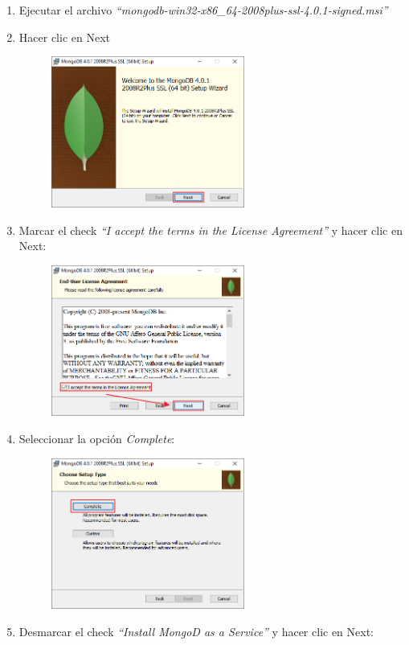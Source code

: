 \documentclass[a4paper,11pt]{paper}
\begin{document}
\begin{enumerate}
\newpage
\item
  Ejecutar el archivo
  \emph{``mongodb-win32-x86\_64-2008plus-ssl-4.0.1-signed.msi''}
\item
  Hacer clic en Next

  \begin{figure}[!h]
  \centering
  \includegraphics[width=0.6\textwidth]{imgs/instalacion/Paso1.png}
  \end{figure}
\item
  Marcar el check \emph{``I accept the terms in the License Agreement''}
  y hacer clic en Next:

  \begin{figure}[!h]
  \centering
  \includegraphics[width=0.6\textwidth]{imgs/instalacion/Paso2.png}
  \end{figure}

\newpage
\item
  Seleccionar la opción \emph{Complete}:

  \begin{figure}[!h]
  \centering
  \includegraphics[width=0.6\textwidth]{imgs/instalacion/Paso3.png}
  \end{figure}
\item
  Desmarcar el check \emph{``Install MongoD as a Service''} y hacer clic
  en Next:


\end{enumerate}
\end{document}
